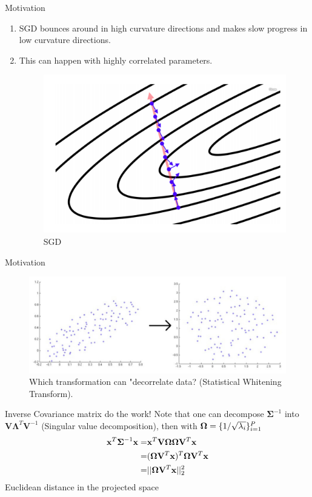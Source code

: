 \documentclass[xcolor=pdftex,dvipsnames,table,mathserif]{beamer}
\begin{document}
\begin{frame}{Motivation}
\begin{enumerate}
\item SGD bounces around in high curvature directions and makes slow progress in low curvature directions. 
\item This can happen with highly correlated parameters.
\begin{figure}
\includegraphics[width=.45\columnwidth]{../graphics/EllipseSGD}
\caption{SGD}%
\end{figure}
\end{enumerate}
\end{frame}


\begin{frame}{Motivation}
\begin{figure}
\includegraphics[width=.75\columnwidth]{../graphics/CorrelatedParameters}
\caption{Which transformation can "decorrelate data? (Statistical Whitening Transform).}%
\end{figure}\pause
\alert{Inverse Covariance matrix do the work!}  \pause
Note that one can decompose $\boldsymbol{\Sigma}^{-1}$ into $\mathbf{V} \boldsymbol{\Lambda}^T \mathbf{V} ^{-1}$ (Singular value decomposition), then with $\boldsymbol{\Omega} = \{1 /\sqrt{\lambda_i} \}_{i=1}^{P}$
\begin{eqnarray}
\mathbf{x}^T \boldsymbol{\Sigma}^{-1} \mathbf{x} =&\mathbf{x}^T \mathbf{V} \boldsymbol{\Omega\Omega}\mathbf{V}^{T}\mathbf{x}  \nonumber \\
=&(\boldsymbol{\Omega}\mathbf{V}^T\mathbf{x})^T \boldsymbol{\Omega}\mathbf{V}^{T}\mathbf{x} \nonumber  \\ 
=&||\boldsymbol{\Omega}\mathbf{V}^T\mathbf{x}||_2^2 \label{EqNormInv}
\end{eqnarray} 
\alert{Euclidean distance in the projected space}
\end{frame}
\end{document}
